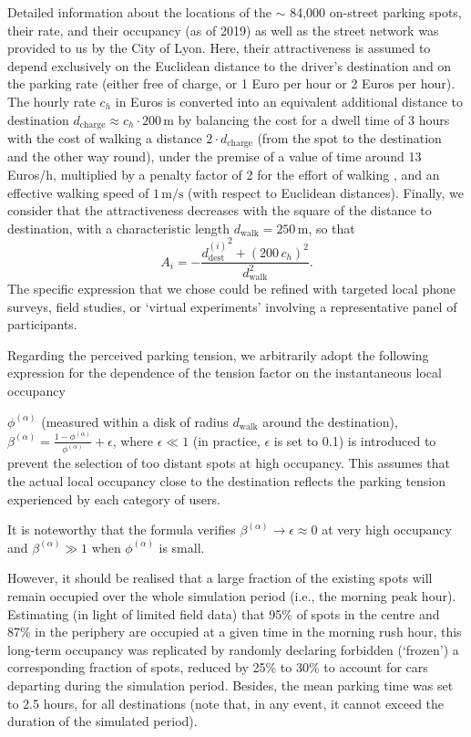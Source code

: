 \documentclass[trsc,reprint]{informs3}
\newcommand{\alp}{^{(\alpha)}}
\newcommand{\AN}[1]{#1}
\begin{document}
Detailed information about the locations of the $\sim$ 84,000 on-street parking spots, their rate, and their occupancy (as of 2019) as well as the street network was provided to us by the City of Lyon.
Here, their attractiveness is assumed to depend exclusively on the Euclidean distance
to the driver's destination and on the parking rate (either free of charge, or 1 Euro per hour or 2 Euros per hour). The hourly rate $c_h$ in Euros is converted into an equivalent additional distance to destination $d_\mathrm{charge}\approx c_h\cdot 200\,\mathrm{m}$ by balancing the cost for a dwell time of 3 hours with the cost of walking a distance $2\cdot d_\mathrm{charge}$ (from the spot to the destination and the other way round), under the premise of a value of time around 13 Euros/h, multiplied by a penalty factor of 2 for the effort of walking \citep{bonsall2004modelling}, and an effective walking speed of $1\,\mathrm{m/s}$ (with respect to Euclidean distances). Finally, we consider that the attractiveness decreases with the square of the distance to destination, with a characteristic length $d_\mathrm{walk}=250\,\mathrm{m}$, so that
\begin{equation}
A_i= -\frac{{d_\mathrm{dest}^{(i)}}^2+(200\,c_h)^2}{d_\mathrm{walk}^2}.
\end{equation}
 The specific expression that we chose could be refined with targeted local phone surveys, field studies, or `virtual experiments' \citep{fulman2020modeling} involving a representative panel of participants.
 
 Regarding the perceived parking tension, we \AN{arbitrarily} adopt the following expression for the dependence of the tension factor on the instantaneous local occupancy
 \AN{
 ${\phi\alp}$ (measured within a disk of radius $d_{\mathrm{walk}}$ around the destination), $\beta\alp=\frac{1-{\phi\alp}}{{\phi\alp}} + \epsilon$,
 where $\epsilon \ll 1$ (in practice, $\epsilon$ is set to 0.1) is introduced to prevent the
 selection of too distant spots at high occupancy.
This assumes that the actual local occupancy close to the destination reflects the 
parking tension experienced by each category of users.
 }
 It is noteworthy that the formula verifies $\beta\alp \to \epsilon \approx 0$ at very high occupancy and $\beta\alp \gg 1$ when $\phi\alp$ is small.


However, it should be realised that a large fraction of the existing spots will remain occupied over the whole simulation period (i.e., the morning peak hour). Estimating \AN{(in light of limited field data)} that 95\% of spots in the centre and 87\% in the periphery are occupied at a given time in the morning rush hour, this long-term occupancy was replicated by randomly
declaring forbidden (`frozen') a corresponding fraction of spots, \AN{reduced by 25\% to 30\% 
to account for cars departing during the simulation period.} Besides, the mean parking time was set to 2.5 hours, for all destinations (note that, in any event, it
cannot exceed the duration of the simulated period).
\end{document}
